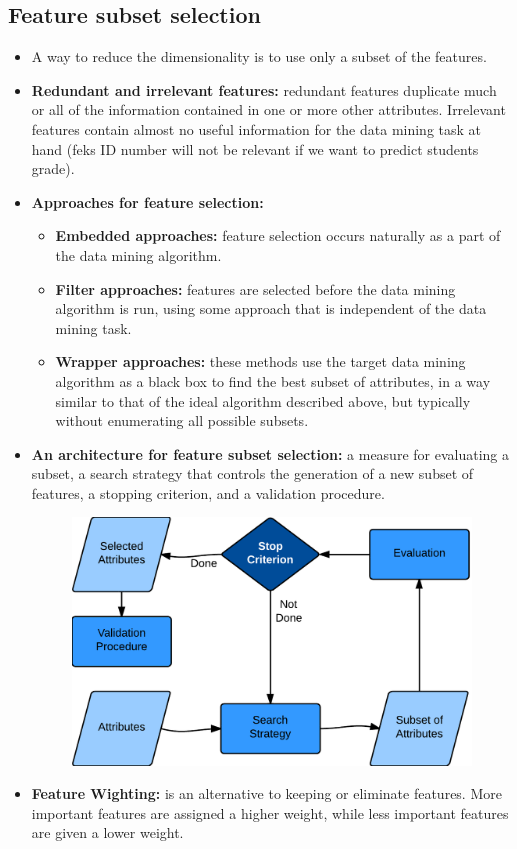 	\clearpage
	\subsection{Feature subset selection}
		\begin{itemize}
			\item A way to reduce the dimensionality is to use only a subset of the 
			features.
			\item {\bf Redundant and irrelevant features:} redundant features duplicate much 
			or all of the information contained in one or more other attributes. Irrelevant
			features contain almost no useful information for the data mining task at hand
			(feks ID number will not be relevant if we want to predict students grade).
			\item {\bf Approaches for feature selection:}
				\begin{itemize}
					\item {\bf Embedded approaches:} feature selection occurs naturally as
					a part of the data mining algorithm.
					\item {\bf Filter approaches:} features are selected before the data
					mining algorithm is run, using some approach that is independent of the
					data mining task. 
					\item {\bf Wrapper approaches:} these methods use the target data mining
					algorithm as a black box to find the best subset of attributes, in a way
					similar to that of the ideal algorithm described above, but typically 
					without enumerating all possible subsets. 
				\end{itemize}
			\item{\bf An architecture for feature subset selection:} 
			a measure for evaluating a subset, a search strategy that controls the generation 
			of a new subset of features, a stopping criterion, and a validation procedure.
				\begin{figure}[H]
					\centering
					\includegraphics[scale=0.2]{pics/featureSelection.png}
				\end{figure} 
			\item{\bf Feature Wighting:} is an alternative to keeping or eliminate features.
			More important features are assigned a higher weight, while less important
			features are given a lower weight. 
		\end{itemize}

